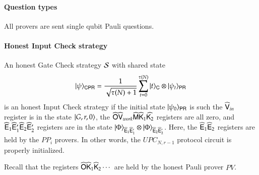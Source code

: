 

\paragraph{Question types} All provers are sent single qubit Pauli questions.

\paragraph{Honest Input Check strategy}
An honest Gate Check strategy $\mathcal{S}$ with shared state
\[
	|\psi\rangle_{{\mathsf{C}} {\mathsf{P}} {\mathsf{R}}} = \frac{1}{\sqrt{\tau(N) + 1}} \sum_{t = 0}^{\tau(N)} |t\rangle_{{\mathsf{C}}} \otimes |\psi_t\rangle_{{\mathsf{P}} {\mathsf{R}}}
\]
is an honest Input Check strategy if the initial state $|\psi_0\rangle_{{\mathsf{P}} {\mathsf{R}}}$ is such the
$\widehat{{\mathsf{V}}}_{in}$ register is in the state $|G,r,0\rangle$, the $\widehat{{\mathsf{O}}} \widehat{{\mathsf{V}}}_{work} \widehat{{\mathsf{M}}} \widehat{{\mathsf{K}}}_1 \widehat{{\mathsf{K}}_2}$ registers are all zero, and $\widehat{{\mathsf{E}}}_1 \widehat{{\mathsf{E}}}_1' \widehat{{\mathsf{E}}}_2 \widehat{{\mathsf{E}}}_2'$ registers are in the state $|\Phi\rangle_{\widehat{{\mathsf{E}}}_1 \widehat{{\mathsf{E}}}_1'} \otimes |\Phi\rangle_{\widehat{{\mathsf{E}}}_2 \widehat{{\mathsf{E}}}_2'}$. Here, the $\widehat{{\mathsf{E}}}_1 \widehat{{\mathsf{E}}}_2$ registers are held by the $PP_i$ provers. In other words, the $UPC_{N,r-1}$ protocol circuit is properly initialized.

Recall that the registers $\widehat{{\mathsf{O}}} \widehat{{\mathsf{K}}}_1 \widehat{{\mathsf{K}}}_2 \cdots$ are held by the honest Pauli prover $PV$.



